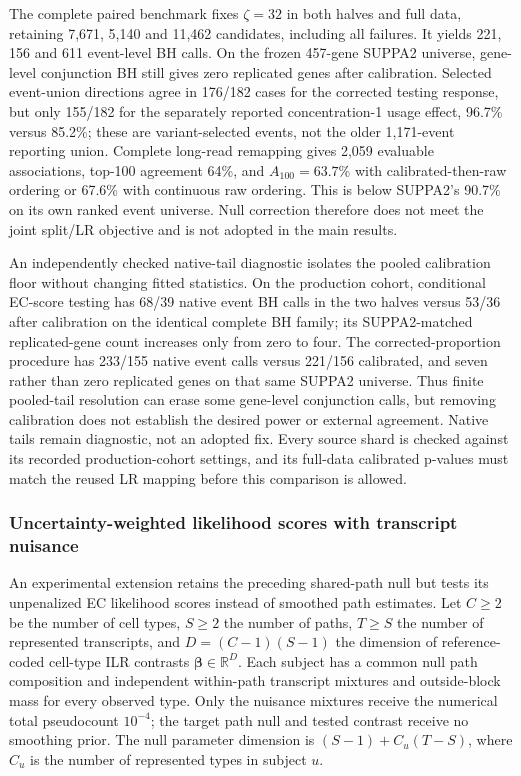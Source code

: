 \documentclass[11pt]{article}
\begin{document}
The complete paired benchmark fixes \(\zeta=32\) in both halves and full data, retaining 7,671, 5,140 and 11,462 candidates, including all failures. It yields 221, 156 and 611 event-level BH calls. On the frozen 457-gene SUPPA2 universe, gene-level conjunction BH still gives zero replicated genes after calibration. Selected event-union directions agree in 176/182 cases for the corrected testing response, but only 155/182 for the separately reported concentration-1 usage effect, 96.7\% versus 85.2\%; these are variant-selected events, not the older 1,171-event reporting union. Complete long-read remapping gives 2,059 evaluable associations, top-100 agreement 64\%, and \(A_{100}=63.7\%\) with calibrated-then-raw ordering or 67.6\% with continuous raw ordering. This is below SUPPA2's 90.7\% on its own ranked event universe. Null correction therefore does not meet the joint split/LR objective and is not adopted in the main results.

An independently checked native-tail diagnostic isolates the pooled calibration floor without changing fitted statistics. On the production cohort, conditional EC-score testing has 68/39 native event BH calls in the two halves versus 53/36 after calibration on the identical complete BH family; its SUPPA2-matched replicated-gene count increases only from zero to four. The corrected-proportion procedure has 233/155 native event calls versus 221/156 calibrated, and seven rather than zero replicated genes on that same SUPPA2 universe. Thus finite pooled-tail resolution can erase some gene-level conjunction calls, but removing calibration does not establish the desired power or external agreement. Native tails remain diagnostic, not an adopted fix. Every source shard is checked against its recorded production-cohort settings, and its full-data calibrated p-values must match the reused LR mapping before this comparison is allowed.

\subsubsection*{Uncertainty-weighted likelihood scores with transcript nuisance}

An experimental extension retains the preceding shared-path null but tests its unpenalized EC likelihood scores instead of smoothed path estimates. Let \(C\ge2\) be the number of cell types, \(S\ge2\) the number of paths, \(T\ge S\) the number of represented transcripts, and \(D=(C-1)(S-1)\) the dimension of reference-coded cell-type ILR contrasts \(\boldsymbol\beta\in\mathbb R^D\). Each subject has a common null path composition and independent within-path transcript mixtures and outside-block mass for every observed type. Only the nuisance mixtures receive the numerical total pseudocount \(10^{-4}\); the target path null and tested contrast receive no smoothing prior. The null parameter dimension is \((S-1)+C_u(T-S)\), where \(C_u\) is the number of represented types in subject \(u\).
\end{document}
